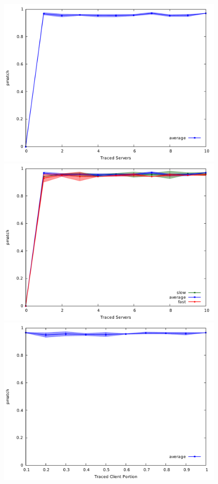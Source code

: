 \begin{figure}[H]
\centering
\includegraphics[scale=0.35]{graphs/s_server_pmatch_average_only.pdf}
\includegraphics[scale=0.35]{graphs/s_server_pmatch.pdf}
\includegraphics[scale=0.35]{graphs/c_tclient_pmatch_average_only.pdf}

\end{figure}
